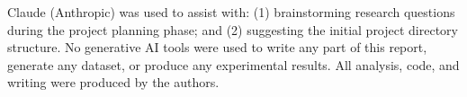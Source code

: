 Claude (Anthropic) was used to assist with: (1) brainstorming research questions during the project planning phase; and (2) suggesting the initial project directory structure.
No generative AI tools were used to write any part of this report, generate any dataset, or produce any experimental results.
All analysis, code, and writing were produced by the authors.
